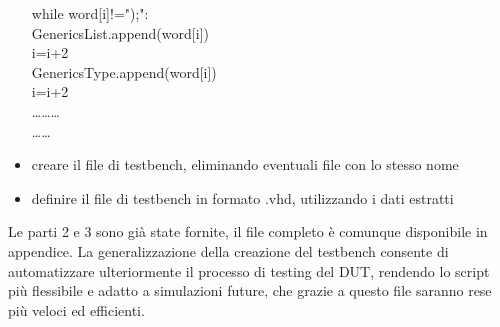 \begin{itemize}
{{	\hspace*{2cm}while word[i]!=");":\\
	\hspace*{3cm}GenericsList.append(word[i])\\
	\hspace*{3cm}i=i+2\\
	\hspace*{1cm}GenericsType.append(word[i])\\
	\hspace*{1cm}i=i+2\\
	………\\
	……\\}}
	\item{creare il file di testbench, eliminando eventuali file con lo stesso nome}
	\item{definire il file di testbench in formato .vhd, utilizzando i dati estratti}
\end{itemize}
Le parti 2 e 3 sono già state fornite, il file completo è comunque disponibile in appendice.
La generalizzazione della creazione del testbench consente di automatizzare ulteriormente il processo di testing del DUT, rendendo lo script più flessibile e adatto a simulazioni future, che grazie a questo file saranno rese più veloci ed efficienti.\\


